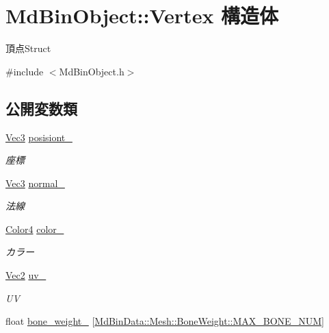 \hypertarget{struct_md_bin_object_1_1_vertex}{}\section{Md\+Bin\+Object\+:\+:Vertex 構造体}
\label{struct_md_bin_object_1_1_vertex}


頂点\+Struct  




{\ttfamily \#include $<$Md\+Bin\+Object.\+h$>$}

\subsection*{公開変数類}
\begin{DoxyCompactItemize}
\item 
\mbox{\hyperlink{_vector3_d_8h_ab16f59e4393f29a01ec8b9bbbabbe65d}{Vec3}} \mbox{\hyperlink{struct_md_bin_object_1_1_vertex_a72d99e25154ce98623654e54dbff6ec1}{posisiont\+\_\+}}
\begin{DoxyCompactList}\small\item\em 座標 \end{DoxyCompactList}\item 
\mbox{\hyperlink{_vector3_d_8h_ab16f59e4393f29a01ec8b9bbbabbe65d}{Vec3}} \mbox{\hyperlink{struct_md_bin_object_1_1_vertex_a37067863a9ec5364209bab6c93df296e}{normal\+\_\+}}
\begin{DoxyCompactList}\small\item\em 法線 \end{DoxyCompactList}\item 
\mbox{\hyperlink{_vector3_d_8h_a9c2339f516cf07ce4753b8a99fab3791}{Color4}} \mbox{\hyperlink{struct_md_bin_object_1_1_vertex_aebf5782db1a0c64232a7cfb3a714f4b4}{color\+\_\+}}
\begin{DoxyCompactList}\small\item\em カラー \end{DoxyCompactList}\item 
\mbox{\hyperlink{_vector3_d_8h_a5ef6e95dfc5f9d3820b71772d99bbc25}{Vec2}} \mbox{\hyperlink{struct_md_bin_object_1_1_vertex_a965874f66728b2e4f29573716ed617d5}{uv\+\_\+}}
\begin{DoxyCompactList}\small\item\em UV \end{DoxyCompactList}\item 
float \mbox{\hyperlink{struct_md_bin_object_1_1_vertex_a10f52f9c01ce8ee2fa8689c226b5a359}{bone\+\_\+weight\+\_\+}} \mbox{[}\mbox{\hyperlink{class_md_bin_data_1_1_mesh_1_1_bone_weight_a2c870f6c96315b6b9630cff3c24b79e7}{Md\+Bin\+Data\+::\+Mesh\+::\+Bone\+Weight\+::\+M\+A\+X\+\_\+\+B\+O\+N\+E\+\_\+\+N\+UM}}\mbox{]}

\end{DoxyCompactItemize}
